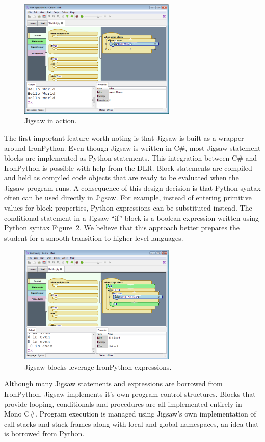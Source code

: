 \documentclass[preprint]{sigplanconf}
\begin{document}
\begin{figure}[h!]
  \centering
     \includegraphics[width=75mm]{jigsaw1.eps}
  \caption{Jigsaw in action.}
  \label{jigsaw1}
\end{figure}

The first important feature worth noting is that Jigsaw is built as a
wrapper around IronPython. Even though Jigsaw is written in C\#, most
Jigsaw statement blocks are implemented as Python statements. This
integration between C\# and IronPython is possible with help from the
DLR. Block statements are compiled and held as compiled code objects
that are ready to be evaluated when the Jigsaw program runs. A
consequence of this design decision is that Python syntax often can be
used directly in Jigsaw. For example, instead of entering primitive
values for block properties, Python expressions can be substituted
instead. The conditional statement in a Jigsaw ``if'' block is a
boolean expression written using Python syntax Figure~\ref{jigsaw2}. We believe
that this approach better prepares the student for a smooth transition
to higher level languages.

\begin{figure}[h!]
  \centering
    \includegraphics[width=75mm]{jigsaw2.eps} 
  \caption{Jigsaw blocks leverage IronPython expressions.}
  \label{jigsaw2}
\end{figure}

Although many Jigsaw statements and expressions are borrowed from
IronPython, Jigsaw implements it’s own program control
structures. Blocks that provide looping, conditionals and procedures
are all implemented entirely in Mono C\#. Program execution is managed
using Jigsaw’s own implementation of call stacks and stack frames
along with local and global namespaces, an idea that is borrowed from
Python.
\end{document}
